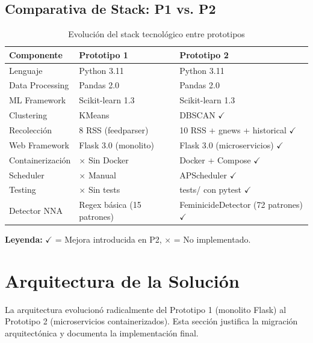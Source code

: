 \subsection{Comparativa de Stack: P1 vs. P2}

\begin{table}[h]
\centering
\caption{Evolución del stack tecnológico entre prototipos}
\begin{tabular}{|l|l|l|}
\hline
\textbf{Componente} & \textbf{Prototipo 1} & \textbf{Prototipo 2} \\ \hline
Lenguaje & Python 3.11 & Python 3.11 \\ \hline
Data Processing & Pandas 2.0 & Pandas 2.0 \\ \hline
ML Framework & Scikit-learn 1.3 & Scikit-learn 1.3 \\ \hline
Clustering & KMeans & DBSCAN $\checkmark$ \\ \hline
Recolección & 8 RSS (feedparser) & 10 RSS + gnews + historical $\checkmark$ \\ \hline
Web Framework & Flask 3.0 (monolito) & Flask 3.0 (microservicios) $\checkmark$ \\ \hline
Containerización & $\times$ Sin Docker & Docker + Compose $\checkmark$ \\ \hline
Scheduler & $\times$ Manual & APScheduler $\checkmark$ \\ \hline
Testing & $\times$ Sin tests & tests/ con pytest $\checkmark$ \\ \hline
Detector NNA & Regex básica (15 patrones) & FeminicideDetector (72 patrones) $\checkmark$ \\ \hline
\end{tabular}
\end{table}

\textbf{Leyenda:} $\checkmark$ = Mejora introducida en P2, $\times$ = No implementado.

\section{Arquitectura de la Solución}
\label{sec:arquitectura}

La arquitectura evolucionó radicalmente del Prototipo 1 (monolito Flask) al Prototipo 2 (microservicios containerizados). Esta sección justifica la migración arquitectónica y documenta la implementación final.

